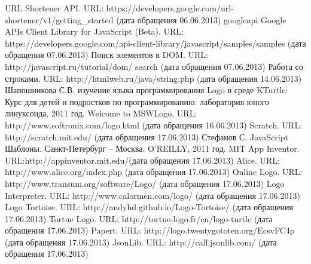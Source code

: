\begin{thebibliography}{99}
	URL Shortener API. URL: https://developers.google.com/url-shortener/v1/getting\_started (дата обращения 06.06.2013)
\bibitem{}googleapi	Google APIs Client Library for JavaScript (Beta). URL: https://developers.google.com/api-client-library/javascript/samples/samples (дата обращения 07.06.2013)
	Поиск элементов в DOM. URL: http://javascript.ru/tutorial/dom/ search (дата обращения 07.06.2013)
	Работа со строками. URL: http://htmlweb.ru/java/string.php (дата обращения 14.06.2013)
	Шапошникова С.В. изучение языка программирования Logo в среде KTurtle: Курс для детей и подростков по программированию: лаборатория юного линуксоида, 2011 год.
	Welcome to MSWLogo. URL: http://www.softronix.com/logo.html (дата обращения 16.06.2013)
	Scratch. URL: http://scratch.mit.edu/ (дата обращения 17.06.2013)
	Стефанов С. JavaScript Шаблоны. Санкт-Петербург  –  Москва. O'REILLY, 2011 год.
	MIT App Inventor. URL:http://appinventor.mit.edu/(дата обращения 17.06.2013)
	Alice. URL: http://www.alice.org/index.php (дата обращения 17.06.2013)
	Online Logo. URL: http://www.transum.org/software/Logo/ (дата обращения 17.06.2013)
	Logo Interpreter. URL: http://www.calormen.com/logo/ (дата обращения 17.06.2013)
	Logo Tortoise. URL: http://andyhd.github.io/Logo-Tortoise/ (дата обращения 17.06.2013)
	Tortue Logo. URL: http://tortue-logo.fr/en/logo-turtle (дата обращения 17.06.2013)
	Papert. URL: http://logo.twentygototen.org/EcsvFC4p (дата обращения 17.06.2013)
	JsonLib. URL: http://call.jsonlib.com/ (дата обращения 17.06.2013)
\end{thebibliography}